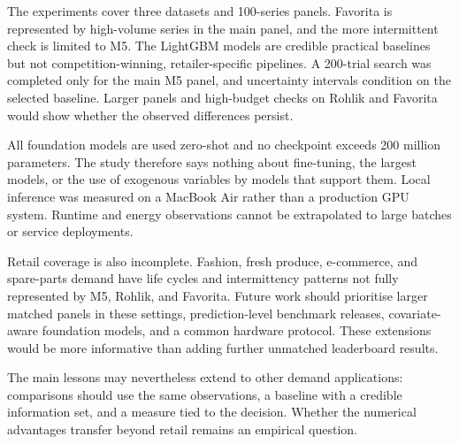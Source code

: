 The experiments cover three datasets and 100-series panels. Favorita is
represented by high-volume series in the main panel, and the more intermittent
check is limited to M5. The LightGBM models are credible practical baselines
but not competition-winning, retailer-specific pipelines. A 200-trial search
was completed only for the main M5 panel, and uncertainty intervals condition
on the selected baseline. Larger panels and high-budget checks on Rohlik and
Favorita would show whether the observed differences persist.

All foundation models are used zero-shot and no checkpoint exceeds 200 million
parameters. The study therefore says nothing about fine-tuning, the largest
models, or the use of exogenous variables by models that support them. Local
inference was measured on a MacBook Air rather than a production GPU system.
Runtime and energy observations cannot be extrapolated to large batches or
service deployments.

Retail coverage is also incomplete. Fashion, fresh produce, e-commerce, and
spare-parts demand have life cycles and intermittency patterns not fully
represented by M5, Rohlik, and Favorita. Future work should prioritise larger
matched panels in these settings, prediction-level benchmark releases,
covariate-aware foundation models, and a common hardware protocol. These
extensions would be more informative than adding further unmatched
leaderboard results.

The main lessons may nevertheless extend to other demand applications:
comparisons should use the same observations, a baseline with a credible
information set, and a measure tied to the decision. Whether the numerical
advantages transfer beyond retail remains an empirical question.
\label{subsec:generalisability}

